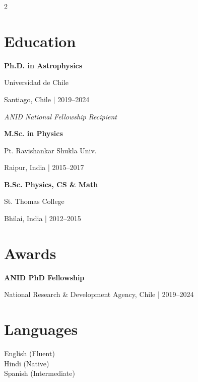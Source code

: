 \documentclass[9pt]{extarticle}
\begin{document}
\begin{paracol}{2}
\section*{Education}
\textbf{\fontsize{8.6}{10.4}\selectfont Ph.D. in Astrophysics}\par
{\fontsize{8.2}{10}\selectfont Universidad de Chile}\par
{\color{muted}\fontsize{7.8}{9.6}\selectfont Santiago, Chile | 2019--2024}\par
{\itshape\fontsize{7.8}{9.6}\selectfont ANID National Fellowship Recipient}\par
\vspace{4pt}
\textbf{\fontsize{8.6}{10.4}\selectfont M.Sc. in Physics}\par
{\fontsize{8.2}{10}\selectfont Pt. Ravishankar Shukla Univ.}\par
{\color{muted}\fontsize{7.8}{9.6}\selectfont Raipur, India | 2015--2017}\par
\vspace{4pt}
\textbf{\fontsize{8.6}{10.4}\selectfont B.Sc. Physics, CS \& Math}\par
{\fontsize{8.2}{10}\selectfont St. Thomas College}\par
{\color{muted}\fontsize{7.8}{9.6}\selectfont Bhilai, India | 2012--2015}\par

\section*{Awards}
\textbf{\fontsize{8.6}{10.4}\selectfont ANID PhD Fellowship}\par
{\color{muted}\fontsize{7.8}{9.6}\selectfont National Research \& Development Agency, Chile | 2019--2024}\par

\section*{Languages}
{\fontsize{8.2}{11}\selectfont English (Fluent)\\Hindi (Native)\\Spanish (Intermediate)}

\end{paracol}
\end{document}
